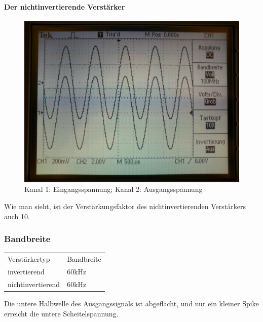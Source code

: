 \paragraph{Der nichtinvertierende Verstärker}
\begin{figure}[H]
	\centering
	\includegraphics[width=\linewidth]{versuch6/oszi/DSC_0480.JPG}
	\caption{Kanal 1: Eingangsspannung; Kanal 2: Ausgangsspannung}
\end{figure}
Wie man sieht, ist der Verstärkungsfaktor des nichtinvertierenden Verstärkers auch 10.

\subsubsection*{Bandbreite}
\begin{tabular}{l l}
	Verstärkertyp & Bandbreite\\
	invertierend & 60kHz\\
	nichtinvertierend & 60kHz\\
\end{tabular}
Die untere Halbwelle des Ausgangssignals ist abgeflacht, und nur ein kleiner Spike erreicht die untere Scheitelspannung.

